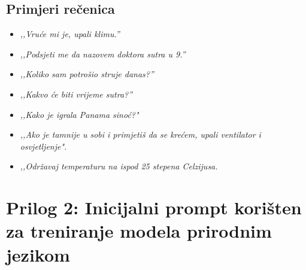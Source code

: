 \documentclass[11pt,a4paper]{article}
\begin{document}
\subsection{Primjeri rečenica}
\begin{itemize}[nosep]
      \item \emph{,,Vruće mi je, upali klimu.''}
      \item \emph{,,Podsjeti me da nazovem doktora sutra u 9.''}
      \item \emph{,,Koliko sam potrošio struje danas?''}
      \item \emph{,,Kakvo će biti vrijeme sutra?''}
      \item \emph{,,Kako je igrala Panama sinoć?"}
      \item \emph{,,Ako je tamnije u sobi i primjetiš da se krećem, upali ventilator i osvjetljenje".}
      \item \emph{,,Održavaj temperaturu na ispod 25 stepena Celzijusa.}
\end{itemize}

\section{Prilog 2: Inicijalni prompt korišten za treniranje modela prirodnim jezikom}
\end{document}
